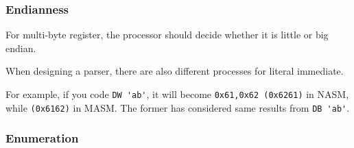 \subsubsection{Endianness}

For multi-byte register, the processor should decide whether it is little or big endian.

When designing a parser, there are also different processes for literal immediate.

For example, if you code \verb|DW 'ab'|, it will become \verb|0x61,0x62 (0x6261)| in NASM, while \verb|(0x6162)| in MASM. The former has considered same results from \verb|DB 'ab'|.



\subsubsection{Enumeration}

